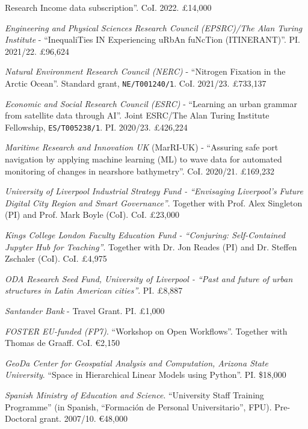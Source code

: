 \documentclass[12pt,2up]{article}
\begin{document}
\begin{cv}{}
\begin{cvlist}{Research Income}
        data subscription''. CoI. 2022. \pounds14,000
\item[2021] \emph{Engineering and Physical Sciences Research Council
    (EPSRC)/The Alan Turing Institute}
    - ``InequaliTies IN Experiencing uRbAn fuNcTion (ITINERANT)''. PI.
    2021/22. \pounds96,624
\item[] \emph{Natural Environment Research Council (NERC)} - ``Nitrogen Fixation in the 
    Arctic Ocean''. Standard grant, \texttt{NE/T001240/1}. CoI. 2021/23. \pounds 733,137
\item[2020] \emph{Economic and Social Research Council (ESRC)} - ``Learning an
    urban grammar from satellite data through AI''. Joint ESRC/The Alan Turing Institute
    Fellowship, \texttt{ES/T005238/1}.
    PI. 2020/23. \pounds426,224
\item[] \emph{Maritime Research and Innovation UK} (MarRI-UK) - ``Assuring
    safe port navigation by applying machine learning (ML) to wave data for
    automated monitoring of changes in nearshore bathymetry''. CoI. 2020/21.
    \pounds169,232
\item[2019] \emph{University of Liverpool Industrial Strategy Fund - ``Envisaging Liverpool's Future Digital City Region and Smart
    Governance''}. Together with Prof. Alex Singleton (PI) and Prof. Mark
    Boyle (CoI). CoI. \pounds23,000
\item[] \emph{Kings College London Faculty Education Fund - ``Conjuring:
    Self-Contained Jupyter Hub for Teaching''}. Together with Dr. Jon Reades
    (PI) and Dr. Steffen Zschaler (CoI). CoI. \pounds4,975
\item[2018] \emph{ODA Research Seed Fund, University of Liverpool - ``Past and future of urban
    structures in Latin American cities''}. PI. \pounds8,887
\item[2017] \emph{Santander Bank} - Travel Grant. PI. \pounds1,000
\item[2014] \emph{FOSTER EU-funded (FP7)}. ``Workshop on Open Workflows''.
    Together with Thomas de Graaff. CoI. \euro2,150
\item[] \emph{GeoDa Center for Geospatial Analysis and Computation, Arizona
    State University}. ``Space in Hierarchical Linear Models using Python''.
    PI. \$18,000

\item[2007] \emph{Spanish Ministry of Education and Science}. ``University
    Staff Training Programme'' (in Spanish, ``Formaci\'{o}n de Personal
    Universitario'', FPU). Pre-Doctoral grant. 2007/10. \euro 48,000


\end{cvlist}
\end{cv}
\end{document}
